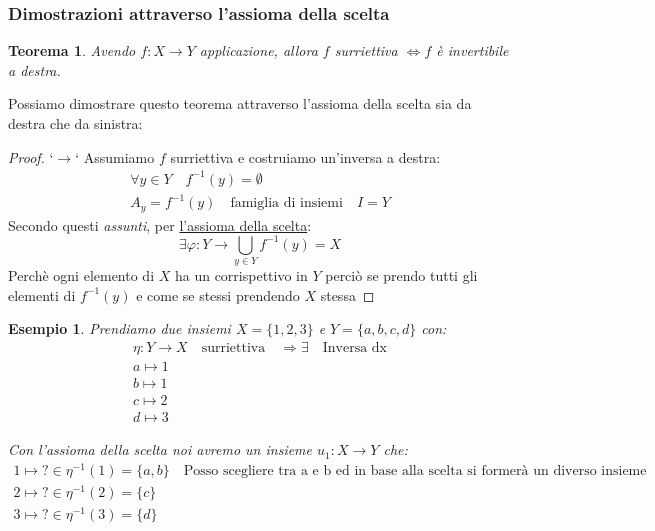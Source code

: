 \documentclass{article}
\newtheorem{exmp}{Esempio}[section]
\newtheorem{theorem}{Teorema}[section]
\begin{document}
\subsubsection{Dimostrazioni attraverso l'assioma della scelta}
\begin{theorem}
        Avendo $ f : X \to Y $ applicazione, allora $ f $ surriettiva $ \Leftrightarrow f $ è invertibile a destra.   
\end{theorem}

Possiamo dimostrare questo teorema attraverso l'assioma della scelta sia da destra che da sinistra:
\begin{proof}
       `$ \rightarrow$`  Assumiamo $ f $ surriettiva e costruiamo un'inversa a destra:
        \begin{align*}
                \forall y \in Y \quad f^{-1}(y) = \emptyset \\
                A_y = f^{-1}(y) \quad \mbox{famiglia di insiemi} \quad  I = Y
        \end{align*}
        Secondo questi \textit{assunti}, per \underline{l'assioma della scelta}:
        \begin{equation*}
                \exists \varphi : Y \to \bigcup_{y \in Y}f^{-1}(y) = X 
        \end{equation*}
        Perchè ogni elemento di $ X $ ha un corrispettivo in $ Y $ perciò se prendo tutti gli elementi di $ f^{-1}(y) $ e come se stessi prendendo $ X $ stessa    
\end{proof}

\begin{exmp}
        Prendiamo due insiemi $ X = \{1,2,3\} $ e $ Y = \{a,b,c,d\} $ con:
        \begin{align*}
                \eta : Y \to X \quad \mbox{surriettiva} \quad  \Rightarrow \exists \quad \mbox{Inversa dx} \\ 
                a \mapsto 1 \\
                b \mapsto 1 \\
                c \mapsto 2 \\
                d \mapsto 3
        \end{align*}
        
        Con l'assioma della scelta noi avremo un insieme $ u_1 : X \to Y $ che:
        \begin{align*}
                1 \mapsto \mbox{?} \in \eta^{-1}(1) = \{a,b\} \quad \mbox{Posso scegliere tra a e b ed in base alla scelta si formerà un diverso insieme} \\
                2 \mapsto \mbox{?} \in \eta^{-1}(2) = \{c\} \\
                3 \mapsto \mbox{?} \in \eta^{-1}(3) = \{d\} 
        \end{align*}
\end{exmp}
\end{document}

